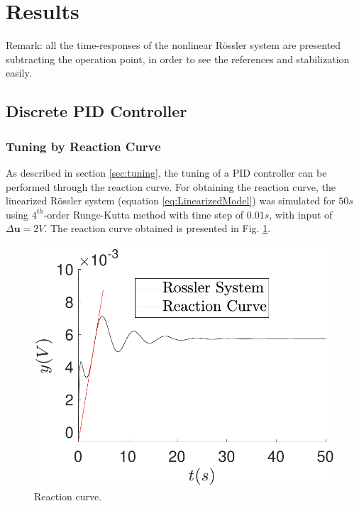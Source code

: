 \section{Results}\label{sec:results}
Remark: all the time-responses of the nonlinear Rössler system are presented subtracting the operation point, in order to see the references and stabilization easily.
\subsection{Discrete PID Controller}
\subsubsection{Tuning by Reaction Curve}
As described in section \ref{sec:tuning}, the tuning of a PID controller can be performed through the reaction curve. For obtaining the reaction curve, the linearized Rössler system (equation \ref{eq:LinearizedModel}) was simulated for $50s$ using $4^{th}$-order Runge-Kutta method with time step of $0.01s$, with input of $\Delta\mathbf{u}=2V$. The reaction curve obtained is presented in Fig. \ref{fig:reaction_curveRossler}.

\begin{figure}[H]
    \centering
    \includegraphics[scale=0.5]{files/reaction_curveRossler.pdf}
    \caption{Reaction curve.}
    \label{fig:reaction_curveRossler}
\end{figure}

